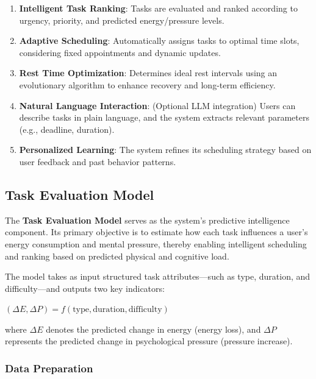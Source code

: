 \documentclass[12pt, a4paper]{article}
\begin{document}
    \begin{enumerate}
        \item \textbf{Intelligent Task Ranking}: Tasks are evaluated and ranked according to urgency, priority, and predicted energy/pressure levels.
        \item \textbf{Adaptive Scheduling}: Automatically assigns tasks to optimal time slots, considering fixed appointments and dynamic updates.
        \item \textbf{Rest Time Optimization}: Determines ideal rest intervals using an evolutionary algorithm to enhance recovery and long-term efficiency.
        \item \textbf{Natural Language Interaction}: (Optional LLM integration) Users can describe tasks in plain language, and the system extracts relevant parameters (e.g., deadline, duration).
        \item \textbf{Personalized Learning}: The system refines its scheduling strategy based on user feedback and past behavior patterns.
    \end{enumerate}
    
    \subsection{Task Evaluation Model}
    
        The \textbf{Task Evaluation Model} serves as the system’s predictive intelligence component. Its primary objective is to estimate how each task influences a user’s energy consumption and mental pressure, thereby enabling intelligent scheduling and ranking based on predicted physical and cognitive load.
    
        The model takes as input structured task attributes—such as type, duration, and difficulty—and outputs two key indicators:
    
        \begin{center}
            $(\Delta E, \Delta P) = f(\text{type}, \text{duration}, \text{difficulty})$
        \end{center}
    
        where $\Delta E$ denotes the predicted change in energy (energy loss), and $\Delta P$ represents the predicted change in psychological pressure (pressure increase).
    
        \subsubsection{Data Preparation}
    
\end{document}
